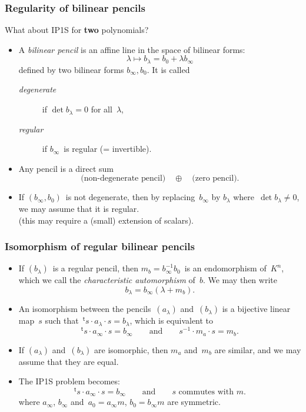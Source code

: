 \documentclass{beamer}%
\def\transpose{{}^{\mathrm{\scriptscriptstyle t}}\!}
\def\strong#1{{\bf\color{rouge}#1}}
\def\emphz#1{\emph{{\color{bleu}#1}}}
\let\mathrm\mathsf
\begin{document}
\begin{frame}\frametitle{Regularity of bilinear pencils}%
What about IP1S for \strong{two} polynomials?
\begin{itemize}
\item A \emphz{bilinear pencil} is an affine line in the space of bilinear
forms:
\begin{equation*}
λ ↦  b_{λ} = b_{0} + λ b_{∞}
\end{equation*}
defined by two bilinear forms $b_{∞}, b_{0}$. It is called
\begin{description}
\item[\emphz{degenerate}] if $\det b_{λ} = 0$ for all~$λ$,
\item[\emphz{regular}] if
$b_{∞}$~is regular (= invertible).
\end{description}
\item Any pencil is a direct sum
\begin{equation*}
{\text{(non-degenerate pencil)}}
\quad⊕\quad {\text{(zero pencil)}}.
\end{equation*}
\item If $(b_{∞}, b_{0})$~is not degenerate, then by
replacing~$b_{∞}$ by $b_{λ}$ where~$\det b_{λ} ≠ 0$, we may assume that
it is regular.\\(this may require a (small) extension of scalars).
\end{itemize}
\end{frame}%
\begin{frame}\frametitle{Isomorphism of regular bilinear pencils}%
\begin{itemize}
\item If $(b_{λ})$~is a regular pencil, then $m_{b} = b_{∞}^{-1} b_0$~is
an endomorphism of~$K^n$, which we call the \emphz{characteristic
automorphism} of~$b$. We may then write
\begin{equation*}
b_{λ} = b_{∞} (λ + m_{b}).
\end{equation*}
\item An isomorphism between the pencils~$(a_{λ})$ and~$(b_{λ})$ is a
bijective linear map~$s$ such that~$\transpose{s} · a_{λ} · s = b_{λ}$,
which is equivalent to
\begin{equation*}
\transpose{s} · a_{∞} · s = b_{∞} \qquad\text{and}\qquad
s^{-1} · m_{a} · s = m_{b}.
\end{equation*}
\item If $(a_{λ})$ and~$(b_{λ})$ are isomorphic, then $m_{a}$ and~$m_{b}$
are similar, and we may assume that they are equal.
\item The IP1S problem becomes:
\begin{equation*}
\transpose{s} · a_{∞} · s = b_{∞} \qquad\text{and}\qquad
\text{$s$~commutes with~$m$.}
\end{equation*}
where $a_{∞}$, $b_{∞}$ and~$a_0 = a_{∞} m$, $b_0 = b_{∞} m$ are symmetric.
\end{itemize}
\end{frame}%
\end{document}
